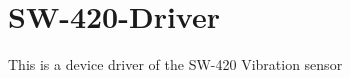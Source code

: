 \chapter{SW-\/420-\/\+Driver}
\hypertarget{md_README}{}\label{md_README}
\label{md_README_autotoc_md0}%
%
This is a device driver of the SW-\/420 Vibration sensor 